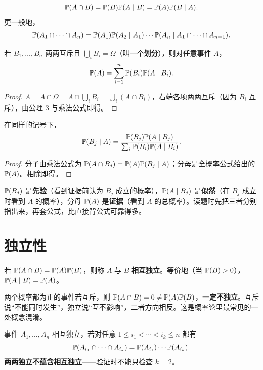 \begin{theorem}[乘法公式]
\[
\mathbb P(A\cap B)=\mathbb P(B)\mathbb P(A\mid B)=\mathbb P(A)\mathbb P(B\mid A).
\]
更一般地，
\[
\mathbb P(A_1\cap\cdots\cap A_n)=\mathbb P(A_1)\mathbb P(A_2\mid A_1)\cdots\mathbb P(A_n\mid A_1\cap\cdots\cap A_{n-1}).
\]
\end{theorem}

\begin{theorem}[全概率公式]
若 $B_1,\ldots,B_n$ 两两互斥且 $\bigcup_i B_i=\Omega$（叫一个\textbf{划分}），则对任意事件 $A$，
\[
\mathbb P(A)=\sum_{i=1}^{n}\mathbb P(B_i)\mathbb P(A\mid B_i).
\]
\end{theorem}
\begin{proof}
$A=A\cap\Omega=A\cap\bigcup_i B_i=\bigcup_i(A\cap B_i)$，右端各项两两互斥（因为 $B_i$ 互斥），由公理 3 与乘法公式即得。
\end{proof}

\begin{theorem}[贝叶斯公式]
在同样的记号下，
\[
\mathbb P(B_j\mid A)=\frac{\mathbb P(B_j)\mathbb P(A\mid B_j)}{\sum_i\mathbb P(B_i)\mathbb P(A\mid B_i)}.
\]
\end{theorem}
\begin{proof}
分子由乘法公式为 $\mathbb P(A\cap B_j)=\mathbb P(A)\mathbb P(B_j\mid A)$；分母是全概率公式给出的 $\mathbb P(A)$。相除即得。
\end{proof}

\begin{teach}[贝叶斯公式的“先验—似然—证据”读法]
$\mathbb P(B_j)$ 是\textbf{先验}（看到证据前认为 $B_j$ 成立的概率），$\mathbb P(A\mid B_j)$ 是\textbf{似然}（在 $B_j$ 成立时看到 $A$ 的概率），分母 $\mathbb P(A)$ 是\textbf{证据}（看到 $A$ 的总概率）。读题时先把三者分别指出来，再套公式，比直接背公式可靠得多。
\end{teach}

\section{独立性}
\begin{definition}[事件的独立性]
若 $\mathbb P(A\cap B)=\mathbb P(A)\mathbb P(B)$，则称 $A$ 与 $B$ \textbf{相互独立}。等价地（当 $\mathbb P(B)>0$），$\mathbb P(A\mid B)=\mathbb P(A)$。
\end{definition}

\begin{pitfall}[互斥 $\ne$ 独立]
两个概率都为正的事件若互斥，则 $\mathbb P(A\cap B)=0\ne\mathbb P(A)\mathbb P(B)$，\textbf{一定不独立}。互斥说“不能同时发生”，独立说“互不影响”，二者方向相反。这是概率论里最常见的一处概念混淆。
\end{pitfall}

\begin{definition}[多个事件的独立性]
事件 $A_1,\ldots,A_n$ 相互独立，若对任意 $1\le i_1<\cdots<i_k\le n$ 都有
\[
\mathbb P(A_{i_1}\cap\cdots\cap A_{i_k})=\mathbb P(A_{i_1})\cdots\mathbb P(A_{i_k}).
\]
\textbf{两两独立不蕴含相互独立}——验证时不能只检查 $k=2$。
\end{definition}

